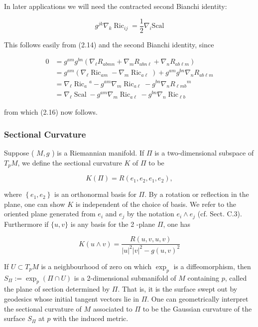 \documentclass[10pt, letterpaper]{article}
\begin{document}
In later applications we will need the contracted second Bianchi identity:

$$
g^{j k} \nabla_{k} \operatorname{Ric}_{i j}=\frac{1}{2} \nabla_{i} \mathrm{Scal}
$$

This follows easily from (2.14) and the second Bianchi identity, since

$$
\begin{aligned}
0 & =g^{a m} g^{b n}\left(\nabla_{\ell} R_{a b m n}+\nabla_{m} R_{a b n \ell}+\nabla_{n} R_{a b \ell m}\right) \\
& =g^{a m}\left(\nabla_{\ell} \operatorname{Ric}_{a m}-\nabla_{m} \operatorname{Ric}_{a \ell}\right)+g^{a m} g^{b n} \nabla_{n} R_{a b \ell m} \\
& =\nabla_{\ell} \operatorname{Ric}_{a}{ }^{a}-g^{a m} \nabla_{m} \operatorname{Ric}_{a \ell}-g^{b n} \nabla_{n} R_{\ell m b}{ }^{m} \\
& =\nabla_{\ell} \operatorname{Scal}-g^{a m} \nabla_{m} \operatorname{Ric}_{a \ell}-g^{b n} \nabla_{n} \operatorname{Ric}_{\ell b}
\end{aligned}
$$

from which (2.16) now follows.

\subsubsection*{Sectional Curvature}
Suppose ( $M, g$ ) is a Riemannian manifold. If $\Pi$ is a two-dimensional subspace of $T_{p} M$, we define the sectional curvature $K$ of $\Pi$ to be

$$
K(\Pi)=R\left(e_{1}, e_{2}, e_{1}, e_{2}\right),
$$

where $\left\{e_{1}, e_{2}\right\}$ is an orthonormal basis for $\Pi$. By a rotation or reflection in the plane, one can show $K$ is independent of the choice of basis. We refer to the oriented plane generated from $e_{i}$ and $e_{j}$ by the notation $e_{i} \wedge e_{j}$ (cf. Sect. C.3). Furthermore if $\{u, v\}$ is any basis for the 2 -plane $\Pi$, one has

$$
K(u \wedge v)=\frac{R(u, v, u, v)}{|u|^{2}|v|^{2}-g(u, v)^{2}}
$$

If $U \subset T_{p} M$ is a neighbourhood of zero on which $\exp _{p}$ is a diffeomorphism, then $S_{\Pi}:=\exp _{p}(\Pi \cap U)$ is a 2-dimensional submanifold of $M$ containing $p$, called the plane of section determined by $\Pi$. That is, it is the surface swept out by geodesics whose initial tangent vectors lie in $\Pi$. One can geometrically interpret the sectional curvature of $M$ associated to $\Pi$ to be the Gaussian curvature of the surface $S_{\Pi}$ at $p$ with the induced metric.
\end{document}

